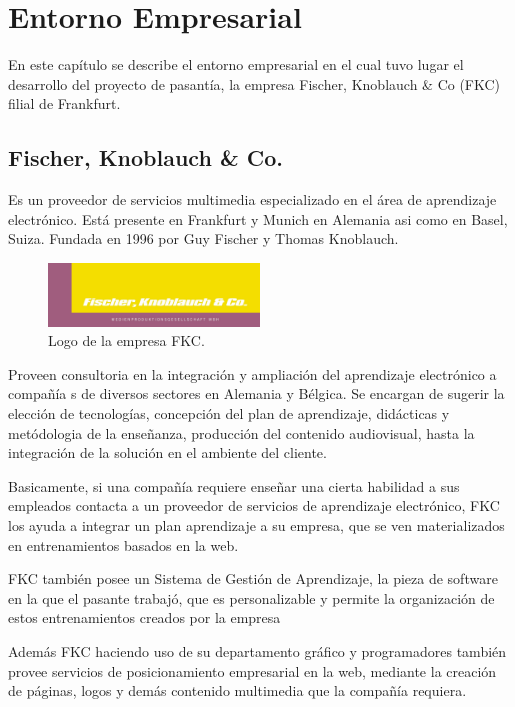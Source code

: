\chapter{Entorno Empresarial}
\thispagestyle{empty} %

En este capítulo se describe el entorno empresarial en el cual tuvo lugar el desarrollo del proyecto de pasantía, la empresa Fischer, Knoblauch \& Co (FKC) filial de Frankfurt.
\section{Fischer, Knoblauch \& Co.}

Es un proveedor de servicios multimedia especializado en el área de aprendizaje electrónico. Está presente en Frankfurt y Munich en Alemania asi como en Basel, Suiza. Fundada en 1996 por Guy Fischer y Thomas Knoblauch.

\begin{figure}[h]
	\begin{center}
		\includegraphics[width=0.5\textwidth]{logos/logoFKC.jpg}
		\caption{Logo de la empresa FKC.} \label{fig:logoFKC}
	\end{center}
\end{figure}


Proveen consultoria en la integración y ampliación del aprendizaje electrónico a compañía
s de diversos sectores en Alemania y Bélgica. Se encargan de sugerir la elección de tecnologías, concepción del plan de aprendizaje, didácticas y metódologia de la enseñanza, producción del contenido audiovisual, hasta la integración de la solución en el ambiente del cliente. 

Basicamente, si una compañía
 requiere enseñar una cierta habilidad a sus empleados contacta a un proveedor de servicios de aprendizaje electrónico, FKC los ayuda a integrar un plan aprendizaje a su empresa, que se ven materializados en entrenamientos basados en la web. 

FKC también posee un Sistema de Gestión de Aprendizaje, la pieza de software en la que el pasante trabajó, que es personalizable y permite la organización de estos entrenamientos creados por la empresa

Además FKC haciendo uso de su departamento gráfico y programadores también provee servicios de posicionamiento empresarial en la web, mediante la creación de páginas, logos y demás contenido multimedia que la compañía
 requiera. 

